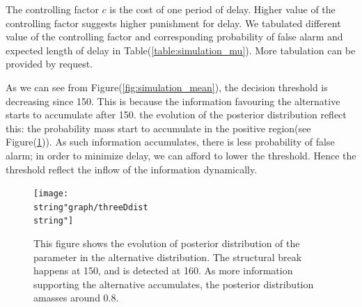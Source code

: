\documentclass[preprint,authoryear,12pt,english]{elsarticle}
\theoremstyle{plain}
\begin{document}
The controlling factor $c$ is the cost of one period of delay. Higher value of the controlling factor suggests higher punishment for delay. We tabulated different value of the controlling factor and corresponding probability of false alarm and expected length of delay in Table(\ref{table:simulation_mu}). More tabulation can be provided by request.

As we can see from Figure(\ref{fig:simulation_mean}), the decision threshold is decreasing since 150. This is because the information favouring the alternative starts to accumulate after 150. the evolution of the posterior distribution reflect this: the probability mass start to accumulate in the positive region(see Figure(\ref{fig:post_dist})). As such information accumulates, there is less probability of false alarm; in order to minimize delay, we can afford to lower the threshold. Hence the threshold reflect the inflow of the information dynamically.
\noindent \begin{center}
    \begin{figure}[H]
        \centering
        \begin{minipage}[c]{1\textwidth}
            \centering
            \texttt{[image: \\string"graph/threeDdist\\string"]}
            \caption{This figure shows the evolution of posterior distribution of the parameter in the alternative distribution. The structural break happens at 150, and is detected at 160. As more information supporting the alternative accumulates, the posterior distribution amasses around 0.8.}
            \label{fig:post_dist}
        \end{minipage}
    \end{figure}
\end{center}
\end{document}
